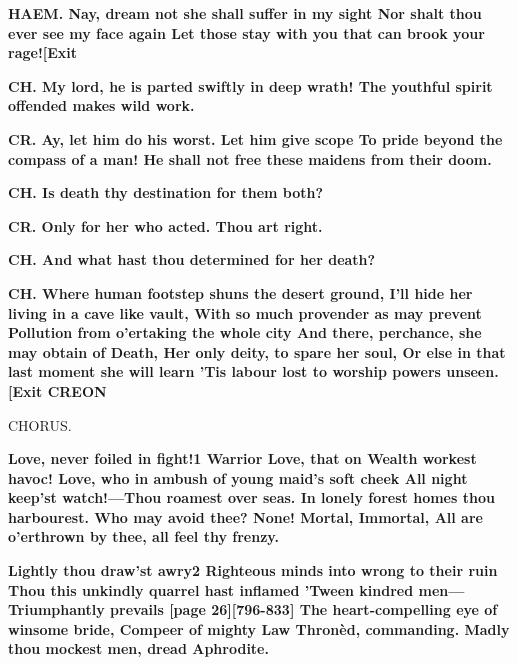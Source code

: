 \documentclass[11pt,letter]{book}
\begin{document}
\par \textbf{HAEM. Nay, dream not she shall suffer in my sight Nor shalt thou ever see my face again Let those stay with you that can brook your rage![Exit}
\par 

\par \textbf{CH. My lord, he is parted swiftly in deep wrath! The youthful spirit offended makes wild work.}
\par 

\par \textbf{CR. Ay, let him do his worst. Let him give scope To pride beyond the compass of a man! He shall not free these maidens from their doom.}
\par 

\par \textbf{CH. Is death thy destination for them both?}
\par 

\par \textbf{CR. Only for her who acted. Thou art right.}
\par 

\par \textbf{CH. And what hast thou determined for her death?}
\par 

\par \textbf{CH. Where human footstep shuns the desert ground, I’ll hide her living in a cave like vault, With so much provender as may prevent Pollution from o’ertaking the whole city And there, perchance, she may obtain of Death, Her only deity, to spare her soul, Or else in that last moment she will learn ’Tis labour lost to worship powers unseen.[Exit CREON}
\par 

\par  CHORUS.

\par \textbf{Love, never foiled in fight!1 Warrior Love, that on Wealth workest havoc! Love, who in ambush of young maid’s soft cheek All night keep’st watch!—Thou roamest over seas. In lonely forest homes thou harbourest. Who may avoid thee? None! Mortal, Immortal, All are o’erthrown by thee, all feel thy frenzy.}
\par 

\par \textbf{Lightly thou draw’st awry2 Righteous minds into wrong to their ruin Thou this unkindly quarrel hast inflamed ’Tween kindred men—Triumphantly prevails [page 26][796-833] The heart-compelling eye of winsome bride, Compeer of mighty Law Thronèd, commanding. Madly thou mockest men, dread Aphrodite.}
\par 
\end{document}
